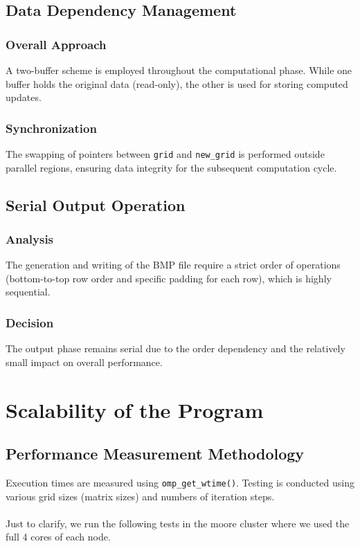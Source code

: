 \documentclass[12pt]{article}
\begin{document}
\newpage
\subsection{Data Dependency Management}

\subsubsection{Overall Approach}
A two-buffer scheme is employed throughout the computational phase. While one buffer holds the original data (read-only), the other is used for storing computed updates.

\subsubsection{Synchronization}
The swapping of pointers between \texttt{grid} and \texttt{new\_grid} is performed outside parallel regions, ensuring data integrity for the subsequent computation cycle.

\subsection{Serial Output Operation}

\subsubsection{Analysis}
The generation and writing of the BMP file require a strict order of operations (bottom-to-top row order and specific padding for each row), which is highly sequential.

\subsubsection{Decision}
The output phase remains serial due to the order dependency and the relatively small impact on overall performance.

\newpage
\section{Scalability of the Program}

\subsection{Performance Measurement Methodology}

Execution times are measured using \texttt{omp\_get\_wtime()}.
Testing is conducted using various grid sizes (matrix sizes) and numbers of iteration steps.
\\\\
Just to clarify, we run the following tests in the moore cluster where we used the full 4 cores of each node.
\end{document}

